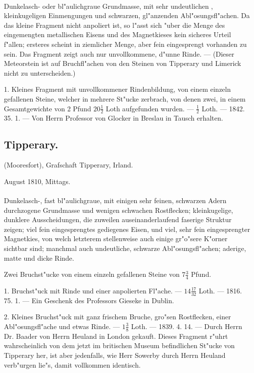 \documentclass[a4paper, 11pt, oneside, polutonikogreek, german]{article}
\begin{document}
\paragraph{}
Dunkelasch- oder bl"aulichgraue Grundmasse, mit sehr undeutlichen , kleinkugeligen Einmengungen und schwarzen, gl"anzenden Abl"osungsfl"achen. Da das kleine Fragment nicht anpoliert ist, so l"asst sich "uber die Menge des eingemengten metallischen Eisens und des Magnetkieses kein sicheres Urteil f"allen; ersteres scheint in ziemlicher Menge, aber fein eingesprengt vorhanden zu sein. Das Fragment zeigt auch nur unvollkommene, d"unne Rinde. --- (Dieser Meteorstein ist auf Bruchfl"achen von den Steinen von Tipperary und Limerick nicht zu unterscheiden.)

1. Kleines Fragment mit unvollkommener Rindenbildung, von einem einzeln gefallenen Steine, welcher in mehrere St"ucke zerbrach, von denen zwei, in einem Gesamtgewichte von 2 Pfund $20\frac{1}{2}$ Loth aufgefunden wurden. --- $\frac{1}{2}$ Loth. --- 1842. 35. 1. --- Von Herrn Professor von Glocker in Breslau in Tausch erhalten.
\subsection{Tipperary.}
\begin{center}
\small
(Mooresfort), Grafschaft Tipperary, Irland.

August 1810, Mittags.
\end{center}
\paragraph{}
Dunkelasch-, fast bl"aulichgraue, mit einigen sehr feinen, schwarzen Adern durchzogene Grundmasse und wenigen schwachen Rostflecken; kleinkugelige, dunklere Ausscheidungen, die zuweilen auseinanderlaufend faserige Struktur zeigen; viel fein eingesprengtes gediegenes Eisen, und viel, sehr fein eingesprengter Magnetkies, von welch letzterem stellenweise auch einige gr"o"sere K"orner sichtbar sind; manchmal auch undeutliche, schwarze Abl"osungsfl"achen; aderige, matte und dicke Rinde.

Zwei Bruchst"ucke von einem einzeln gefallenen Steine von $7\frac{3}{4}$ Pfund.

1. Bruchst"uck mit Rinde und einer anpolierten Fl"ache. --- $14\frac{17}{32}$ Loth. --- 1816. 75. 1. --- Ein Geschenk des Professors Gieseke in Dublin.

2. Kleines Bruchst"uck mit ganz frischem Bruche, gro"sen Rostflecken, einer Abl"osungsfl"ache und etwas Rinde. --- $1\frac{3}{8}$ Loth. --- 1839. 4. 14. --- Durch Herrn Dr. Baader von Herrn Heuland in London gekauft. Dieses Fragment r"uhrt wahrscheinlich von dem jetzt im britischen Museum befindlichen St"ucke von Tipperary her, ist aber jedenfalls, wie Herr Sowerby durch Herrn Heuland verb"urgen lie"s, damit vollkommen identisch.
\end{document}
